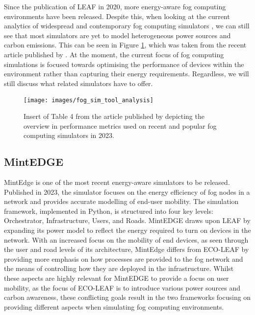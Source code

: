 \documentclass{l4proj}
\begin{document}
Since the publication of LEAF in 2020, more energy-aware fog computing environments have been released.
Despite this, when looking at the current analytics of widespread and contemporary fog computing simulators \citep{fogSimToolAnalysis}, we can still see that most simulators are yet to model heterogeneous power sources and carbon emissions.
This can be seen in Figure \ref{fig:fogtoolsanalysis}, which was taken from the recent article published by \cite{fogSimToolAnalysis}.
At the moment, the current focus of fog computing simulations is focused towards optimising the performance of devices within the environment rather than capturing their energy requirements.
Regardless, we will still discuss what related simulators have to offer.
\begin{figure}[h]
    \centering
    \texttt{[image: images/fog\_sim\_tool\_analysis]}
    ~
    \caption{Insert of Table 4 from the article published by \cite{fogSimToolAnalysis} depicting the overview in performance metrics used on recent and popular fog computing simulators in 2023.}
    \label{fig:fogtoolsanalysis}
\end{figure}

\subsection{MintEDGE}
MintEdge \citep{mintedge} is one of the most recent energy-aware simulators to be released.
Published in 2023, the simulator focuses on the energy efficiency of fog nodes in a network and provides accurate modelling of end-user mobility.
The simulation framework, implemented in Python, is structured into four key levels: Orchestrator, Infrastructure, Users, and Roads.
MintEDGE draws upon LEAF by expanding its power model to reflect the energy required to turn on devices in the network.
With an increased focus on the mobility of end devices, as seen through the user and road levels of its architecture, MintEdge differs from ECO-LEAF by providing more emphasis on how processes are provided to the fog network and the means of controlling how they are deployed in the infrastructure.
Whilst these aspects are highly relevant for MintEDGE to provide a focus on user mobility, as the focus of ECO-LEAF is to introduce various power sources and carbon awareness, these conflicting goals result in the two frameworks focusing on providing different aspects when simulating fog computing environments.
\end{document}
